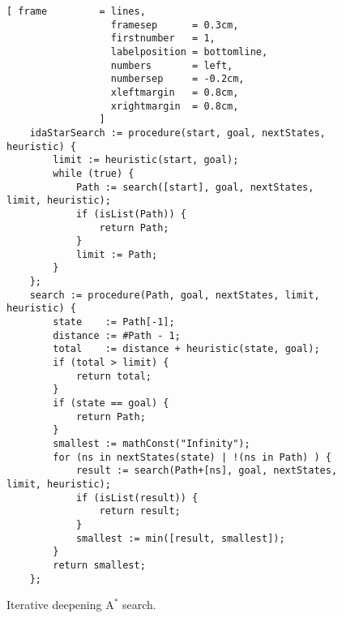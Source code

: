 \begin{figure}[!ht]
\centering
\begin{Verbatim}[ frame         = lines,
                  framesep      = 0.3cm,
                  firstnumber   = 1,
                  labelposition = bottomline,
                  numbers       = left,
                  numbersep     = -0.2cm,
                  xleftmargin   = 0.8cm,
                  xrightmargin  = 0.8cm,
                ]
    idaStarSearch := procedure(start, goal, nextStates, heuristic) {
        limit := heuristic(start, goal);
        while (true) {
            Path := search([start], goal, nextStates, limit, heuristic);
            if (isList(Path)) {
                return Path;
            }
            limit := Path;
        }
    };
    search := procedure(Path, goal, nextStates, limit, heuristic) {
        state    := Path[-1];
        distance := #Path - 1;
        total    := distance + heuristic(state, goal);
        if (total > limit) {
            return total;
        }
        if (state == goal) {
            return Path;
        }
        smallest := mathConst("Infinity");
        for (ns in nextStates(state) | !(ns in Path) ) {
            result := search(Path+[ns], goal, nextStates, limit, heuristic);
            if (isList(result)) {
                return result;
            }
            smallest := min([result, smallest]);
        }
        return smallest;
    };
\end{Verbatim}
\vspace*{-0.3cm}
\caption{Iterative deepening $\textrm{A}^*$ search.}
\label{fig:iterative-deepening-a-star.stlx}
\end{figure}
